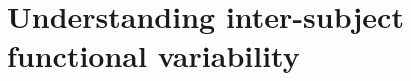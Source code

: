 

\chapter{Understanding inter-subject functional variability}\label{chap:intro_fmri}

\label{Chapter_1}



\vspace*{\fill}







